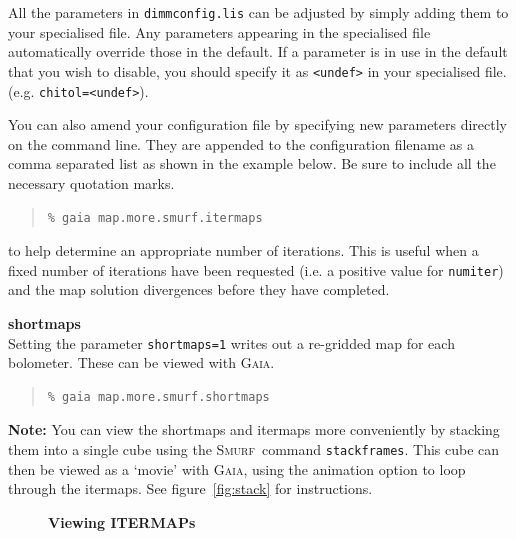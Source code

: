 \documentclass[twoside,11pt]{article}
\newenvironment{latexonly}{}{}
\newcommand{\xref}[3]{#1}
\renewcommand{\_}{\texttt{\symbol{95}}}
\newenvironment{fmpage}[1]{\begin{lrbox}{\fmbox}\begin{minipage}{#1}}{\end{minipage}\end{lrbox}\fbox{\usebox{\fmbox}}}
\newenvironment{myquote}{\begin{quote}\begin{small}}{\end{small}\end{quote}}
\newcommand{\gaia}{\xref{\textsc{Gaia}}{sun214}{}}
\newcommand{\smurf}{\xref{\textsc{Smurf}}{sun258}{}}
\begin{document}
All the parameters in \texttt{dimmconfig.lis} can be adjusted by
simply adding them to your specialised file. Any parameters appearing
in the specialised file automatically override those in the default.
If a parameter is in use in the default that you wish to disable, you
should specify it as \texttt{<undef>} in your specialised file. (e.g.
\texttt{chitol=<undef>}).

You can also amend your configuration file by specifying new
parameters directly on the command line. They are appended to the
configuration filename as a comma separated list as shown in the
example below. Be sure to include all the necessary quotation marks.

\begin{latexonly}
\begin{myquote}
\begin{verbatim}
% gaia map.more.smurf.itermaps
\end{verbatim}
\end{myquote}
to help determine an appropriate number of iterations. This is useful
when a fixed number of iterations have been requested (i.e. a positive
value for \texttt{numiter}) and the map solution divergences before
they have completed.

\textbf{shortmaps}\\
Setting the parameter \texttt{shortmaps=1} writes out a re-gridded map
for each bolometer. These can be viewed with \gaia.

\begin{myquote}
\begin{verbatim}
% gaia map.more.smurf.shortmaps
\end{verbatim}
\end{myquote}

\textbf{Note:} You can view the shortmaps and itermaps more conveniently by stacking
them into a single cube using the \smurf\ command
\texttt{stackframes}. This cube can then be viewed as a `movie' with
\gaia, using the animation option to loop through the itermaps. See
figure~\ref{fig:stack} for instructions.
\begin{figure}[ht!]
\begin{center}
\begin{fmpage}{0.95\linewidth}
\vspace{0.2cm}
\hspace{2mm}
\textbf{Viewing ITERMAPs}

\vspace{0.5cm}

\begin{minipage}[c]{0.65\linewidth}


\end{minipage}
\end{fmpage}
\end{center}
\end{figure}
\end{latexonly}
\end{document}
